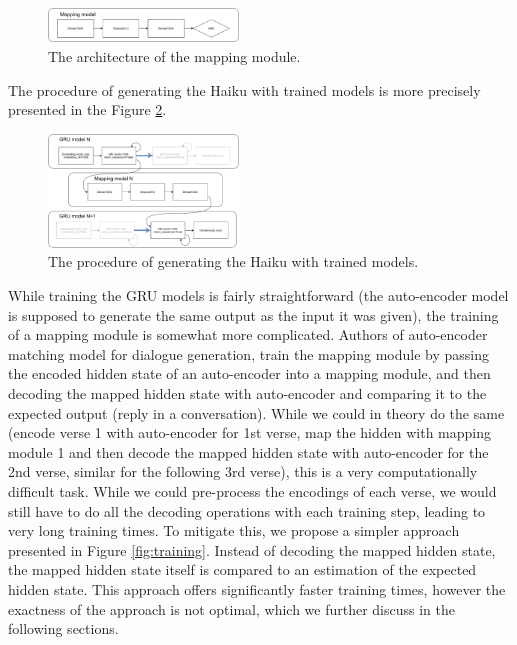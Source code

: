 \documentclass{acm_proc_article-sp}
\begin{document}
\begin{figure}[h!]
	\centering
	\includegraphics[width=0.45\textwidth]{flowchart/mapping.pdf}
    \caption[The architecture of the mapping module.]{The architecture of the mapping module.}
    \label{fig:mapping}
\end{figure}

The procedure of generating the Haiku with trained models is more precisely presented in the Figure \ref{fig:generation}.

\begin{figure}[h!]
	\centering
	\includegraphics[width=0.45\textwidth]{flowchart/generation.pdf}
    \caption[The procedure of generating the Haiku with trained models.]{The procedure of generating the Haiku with trained models.}
    \label{fig:generation}
\end{figure}

While training the GRU models is fairly straightforward (the auto-encoder model is supposed to generate the same output as the input it was given), the training of a mapping module is somewhat more complicated. Authors \cite{luo2018autoencoder} of auto-encoder matching model for dialogue generation, train the mapping module by passing the encoded hidden state of an auto-encoder into a mapping module, and then decoding the mapped hidden state with auto-encoder and comparing it to the expected output (reply in a conversation). While we could in theory do the same (encode verse 1 with auto-encoder for 1st verse, map the hidden with mapping module 1 and then decode the mapped hidden state with auto-encoder for the 2nd verse, similar for the following 3rd verse), this is a very computationally difficult task. While we could pre-process the encodings of each verse, we would still have to do all the decoding operations with each training step, leading to very long training times. To mitigate this, we propose a simpler approach presented in Figure \ref{fig:training}. Instead of decoding the mapped hidden state, the mapped hidden state itself is compared to an estimation of the expected hidden state. This approach offers significantly faster training times, however the exactness of the approach is not optimal, which we further discuss in the following sections.
\end{document}
